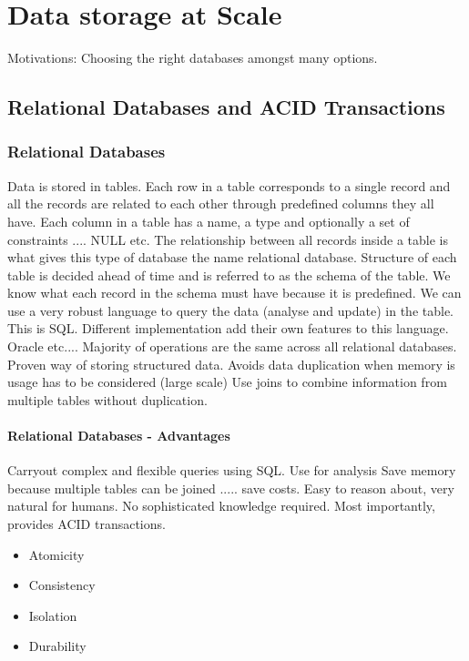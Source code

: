 \chapter{Data storage at Scale}

Motivations: Choosing the right databases amongst many options.

\section{Relational Databases and ACID Transactions}

\subsection{Relational Databases}
Data is stored in tables.
Each row in a table corresponds to a single record and all the records are related to each other through predefined columns they all have.
Each column in a table has a name, a type and optionally a set of constraints .... NULL etc.
The relationship between all records inside a table is what gives this type of database the name relational database.
Structure of each table is decided ahead of time and is referred to as the schema of the table.
We know what each record in the schema must have because it is predefined.
We can use a very robust language to query the data (analyse and update) in the table.
This is SQL.
Different implementation add their own features to this language.
Oracle etc....
Majority of operations are the same across all relational databases.
Proven way of storing structured data.
Avoids data duplication when memory is usage has to be considered (large scale)
Use joins to combine information from multiple tables without duplication.

\subsubsection{Relational Databases - Advantages}
Carryout complex and flexible queries using SQL. Use for analysis
Save memory because multiple tables can be joined ..... save costs.
Easy to reason about, very natural for humans.
No sophisticated knowledge required.
Most importantly, provides ACID transactions.

\begin{itemize}
    \item Atomicity
    \item Consistency
    \item Isolation
    \item Durability
\end{itemize}

